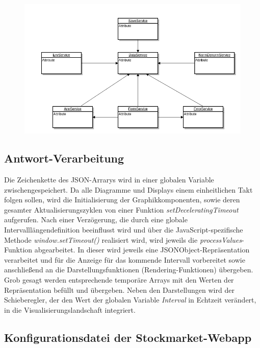 \begin{figure}
\includegraphics[width=15cm]{Bilder/Umsetzung/sequence_dia_service_layer.png}
\end{figure}


\subsection{Antwort-Verarbeitung}
Die Zeichenkette des JSON-Arrarys wird in einer globalen Variable zwischengespeichert. Da alle Diagramme und Displays einem einheitlichen Takt folgen sollen, wird die Initialisierung der Graphikkomponenten, sowie deren gesamter Aktualisierungszyklen von einer Funktion \emph{setDeceleratingTimeout} aufgerufen. Nach einer Verzögerung, die durch eine globale Intervalllängendefinition beeinflusst wird und über die JavaScript-spezifische Methode \emph{window.setTimeout()} realisiert wird, wird jeweils die \emph{processValues}-Funktion abgearbeitet. In dieser wird jeweils eine JSONObject-Repräsentation verarbeitet und für die Anzeige für das kommende Intervall vorbereitet sowie anschließend an die Darstellungsfunktionen (Rendering-Funktionen) übergeben. Grob gesagt werden entsprechende temporäre Arrays mit den Werten der Repräsentation befüllt und übergeben. Neben den Darstellungen wird der Schieberegler, der den Wert der globalen Variable \emph{Interval} in Echtzeit verändert, in die Visualisierungslandschaft integriert. 

\subsection{Konfigurationsdatei der Stockmarket-Webapp}

